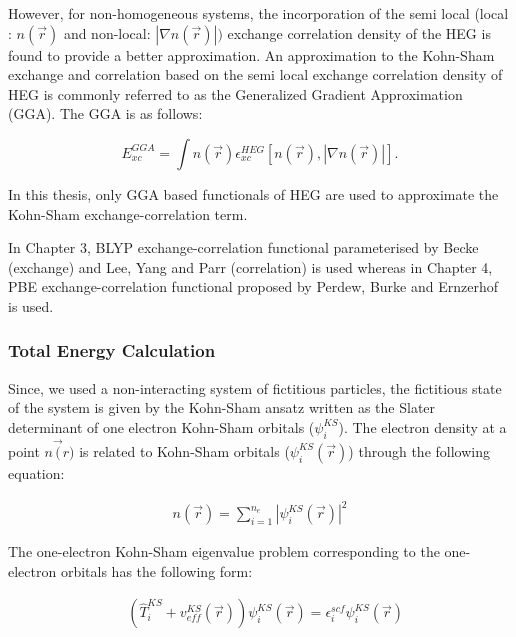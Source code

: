 \noindent However, for non-homogeneous systems, the incorporation of the semi local (local : $n(\vec{r})$ and non-local: $|\nabla n(\vec{r})|)$ exchange correlation density of the HEG is found to provide a better approximation. An approximation to the Kohn-Sham exchange and correlation based on the semi local exchange correlation density of HEG is commonly referred to as the Generalized Gradient Approximation (GGA). The GGA is as follows:  

\begin{equation}
\label{DFT-8}
E_{{xc}}^{{GGA}} = \int n(\vec{r}) \epsilon_{{xc}}^{{HEG}}[n(\vec{r}),|\nabla n(\vec{r})|].
\end{equation} 


\noindent In this thesis, only GGA based functionals of HEG are used to approximate the Kohn-Sham exchange-correlation term. 

\noindent In Chapter 3,  BLYP exchange-correlation functional  parameterised by Becke (exchange) and  Lee, Yang and Parr (correlation)  \cite{becke1988density,lee1988development} is used whereas in Chapter 4, PBE exchange-correlation functional proposed by Perdew, Burke and Ernzerhof\cite{GGA-PBE1996} is used. 

\subsubsection*{Total Energy Calculation}

\noindent Since, we used a non-interacting system of fictitious particles, the fictitious state of the system is given by the Kohn-Sham ansatz written as the Slater determinant of one electron Kohn-Sham orbitals ($\psi^{KS}_i$).  The electron density at a point $n\vec(r)$ is related to Kohn-Sham orbitals ($\psi^{KS}_i(\vec{r})$) through the following equation:

\begin{align}
    n(\vec{r})=\sum_{i=1}^{n_e}|\psi^{KS}_i(\vec{r})|^2 \label{DFT-9}
\end{align}

\noindent The one-electron Kohn-Sham eigenvalue problem corresponding to the one-electron orbitals has the following form:

 \begin{align}
  &\left(\hat{T}^{KS}_i+v^{KS}_{eff}(\vec{r})\right)\psi^{KS}_i(\vec{r})  =\epsilon^{scf}_i\psi^{KS}_i(\vec{r}) \label{DFT-10-1}\\
 \end{align}

